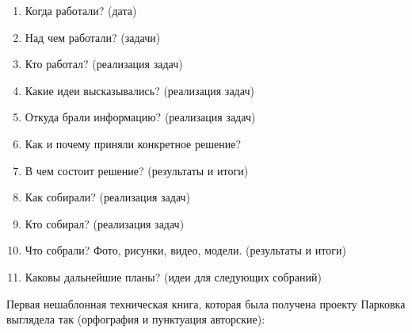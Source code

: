 \begin{enumerate}
	\item Когда работали? (дата)
	\item Над чем работали? (задачи)
	\item Кто работал? (реализация задач)
	\item Какие идеи высказывались? (реализация задач)
	\item Откуда брали информацию? (реализация задач)
	\item Как и почему приняли конкретное решение?
	\item В чем состоит решение? (результаты и итоги)
	\item Как собирали? (реализация задач)
	\item Кто собирал? (реализация задач)
	\item Что собрали? Фото, рисунки, видео, модели. (результаты и итоги)
	\item Каковы дальнейшие планы? (идеи для следующих собраний)
\end{enumerate}

Первая нешаблонная техническая книга, которая была получена проекту Парковка  выглядела так (орфография и пунктуация авторские):\\\\


